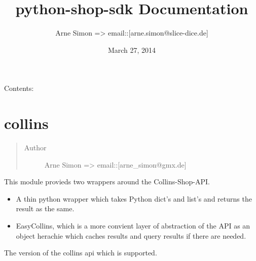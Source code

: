 \documentclass[letterpaper,10pt,english]{sphinxmanual}
\title{python-shop-sdk Documentation}
\date{March 27, 2014}
\author{Arne Simon =\textgreater{} email::{[}arne.simon@slice-dice.de{]}}
\begin{document}
\maketitle
\tableofcontents
{}\label{index::doc}


Contents:


\chapter{collins}
\label{collins:collins}\label{collins:welcome-to-python-shop-sdk-s-documentation}\label{collins::doc}\label{collins:module-collins}\begin{quote}\begin{description}
\item[{Author}] \leavevmode
Arne Simon =\textgreater{} email::{[}arne\_simon@gmx.de{]}

\end{description}\end{quote}

This module provieds two wrappers around the Collins-Shop-API.
\begin{itemize}
\item {} 
A thin python wrapper which takes Python dict's and list's and returns the
result as the same.

\item {} 
EasyCollins, which is a more convient layer of abstraction of the API as an
object herachie which caches results and query results if there are needed.

\end{itemize}

\begin{fulllineitems}
\label{collins:collins.COLLINS_VERSION}
The version of the collins api which is supported.

\end{fulllineitems}

\end{document}
